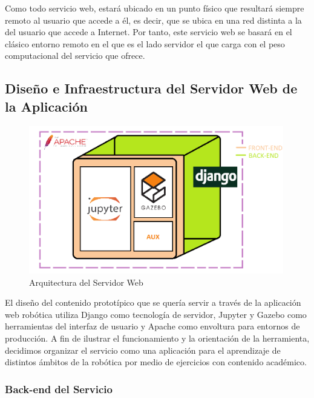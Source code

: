 Como todo servicio web, estará ubicado en un punto físico que resultará siempre remoto al usuario que accede a él, es decir, que se ubica en una red distinta a la del usuario que accede a Internet. Por tanto, este servicio web se basará en el clásico entorno remoto en el que es el lado servidor el que carga con el peso computacional del servicio que ofrece.

\subsection{Diseño e Infraestructura del Servidor Web de la Aplicación}

\begin{figure}[!ht]  \centering\noindent
    \includegraphics[width=0.99\textwidth]{figures/app_structure.png}
    \caption{Arquitectura del Servidor Web}
    \label{appstructure}
\end{figure}

El diseño del contenido prototípico que se quería servir a través de la aplicación web robótica utiliza Django como tecnología de servidor, Jupyter y Gazebo como herramientas del interfaz de usuario y Apache como envoltura para entornos de producción. A fin de ilustrar el funcionamiento y la orientación de la herramienta, decidimos organizar el servicio como una aplicación para el aprendizaje de distintos ámbitos de la robótica por medio de ejercicios con contenido académico.

\subsubsection{Back-end del Servicio}


